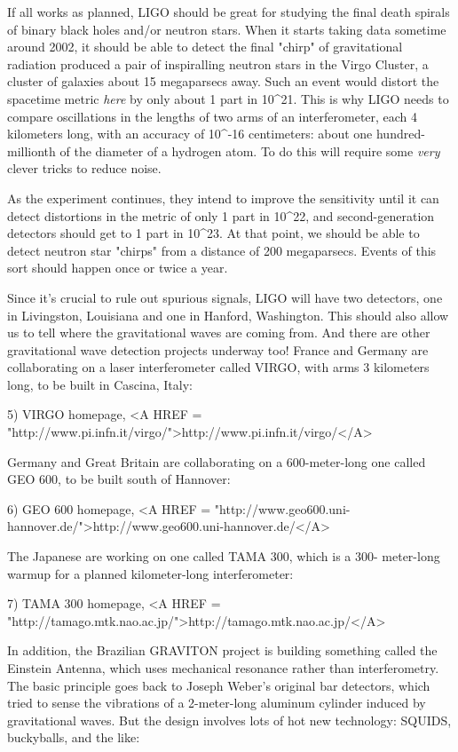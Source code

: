 If all works as planned, LIGO should be great for studying the final 
death spirals of binary black holes and/or neutron stars.  When it 
starts taking data sometime around 2002, it should be able to detect 
the final "chirp" of gravitational radiation produced a pair of 
inspiralling neutron stars in the Virgo Cluster, a cluster of galaxies 
about 15 megaparsecs away.  Such an event would distort the spacetime 
metric \emph{here} by only about 1 part in 10^{21}.   This is why LIGO needs 
to compare oscillations in the lengths of two arms of an interferometer, 
each 4 kilometers long, with an accuracy of 10^{-16} centimeters: about 
one hundred-millionth of the diameter of a hydrogen atom.  To do this 
will require some \emph{very} clever tricks to reduce noise.  

As the experiment continues, they intend to improve the sensitivity 
until it can detect distortions in the metric of only 1 part in 10^{22},
and second-generation detectors should get to 1 part in 10^{23}.  At 
that point, we should be able to detect neutron star "chirps" from a
distance of 200 megaparsecs.  Events of this sort should happen once or 
twice a year.  

Since it's crucial to rule out spurious signals, LIGO will have two 
detectors, one in Livingston, Louisiana and one in Hanford, Washington.
This should also allow us to tell where the gravitational waves are
coming from.  And there are other gravitational wave detection projects 
underway too!  France and Germany are collaborating on a laser 
interferometer called VIRGO, with arms 3 kilometers long, to be built 
in Cascina, Italy:

5) VIRGO homepage, <A HREF = "http://www.pi.infn.it/virgo/">http://www.pi.infn.it/virgo/</A>

Germany and Great Britain are collaborating on a 600-meter-long
one called GEO 600, to be built south of Hannover:

6) GEO 600 homepage, <A HREF = "http://www.geo600.uni-hannover.de/">http://www.geo600.uni-hannover.de/</A>

The Japanese are working on one called TAMA 300, which is a 300-
meter-long warmup for a planned kilometer-long interferometer: 

7) TAMA 300 homepage, <A HREF = "http://tamago.mtk.nao.ac.jp/">http://tamago.mtk.nao.ac.jp/</A>

In addition, the Brazilian GRAVITON project is building something 
called the Einstein Antenna, which uses mechanical resonance rather
than interferometry.  The basic principle goes back to Joseph Weber's 
original bar detectors, which tried to sense the vibrations of a 
2-meter-long aluminum cylinder induced by gravitational waves.  But 
the design involves lots of hot new technology: SQUIDS, buckyballs, 
and the like:

